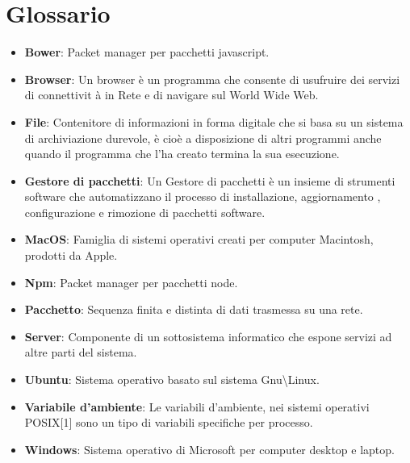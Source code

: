 \section{Glossario}

\begin{itemize}

\item \textbf{Bower}: Packet manager per pacchetti javascript.

\item \textbf{Browser}: Un browser \`{e} un programma che consente di usufruire dei servizi di connettivit \`{a} in Rete e di navigare sul World Wide Web.

\item \textbf{File}: Contenitore di informazioni in forma digitale che si basa su un sistema di archiviazione durevole, \`{e} cio\`{e} a disposizione di altri programmi anche quando il programma che l'ha creato termina la sua esecuzione.

\item \textbf{Gestore di pacchetti}: Un Gestore di pacchetti \`{e} un insieme di strumenti software che automatizzano il processo di installazione, aggiornamento , configurazione e rimozione di pacchetti software.

\item \textbf{MacOS}: Famiglia di sistemi operativi creati per computer Macintosh, prodotti da Apple.

\item \textbf{Npm}: Packet manager per pacchetti node.

\item \textbf{Pacchetto}:  Sequenza finita e distinta di dati trasmessa su una rete.

\item \textbf{Server}: Componente di un sottosistema informatico che espone servizi ad altre parti del sistema.

\item \textbf{Ubuntu}: Sistema operativo basato sul sistema Gnu\textbackslash Linux.

\item \textbf{Variabile d'ambiente}: Le variabili d'ambiente, nei sistemi operativi POSIX[1] sono un tipo di variabili specifiche per processo.

\item \textbf{Windows}: Sistema operativo di Microsoft per computer desktop e laptop.

\end{itemize}

